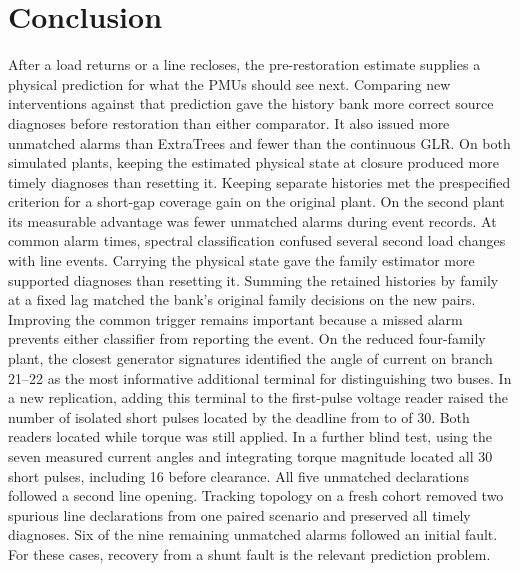 \section{Conclusion}
\label{sec:conclusion}

After a load returns or a line recloses, the pre-restoration estimate
supplies a physical prediction for what the PMUs should see next.
Comparing new interventions against that prediction gave the history
bank more correct source diagnoses before restoration than either
comparator. It also issued more unmatched alarms than ExtraTrees and
fewer than the continuous GLR. On both simulated plants, keeping the
estimated physical state at closure produced more timely diagnoses
than resetting it. Keeping separate histories met the prespecified criterion for a
short-gap coverage gain on the original plant. On the second plant its
measurable advantage was fewer unmatched alarms during event records.
At common alarm times, spectral classification confused several second
load changes with line events. Carrying the physical state gave the
family estimator more supported diagnoses than resetting it. Summing
the retained histories by family at a fixed lag matched the bank's
original family decisions on the new pairs. Improving the common
trigger remains important because a missed alarm prevents either
classifier from reporting the event. On the reduced four-family plant,
the closest generator signatures identified the angle of current on
branch 21--22 as the most informative additional terminal for
distinguishing two buses. In a new
replication, adding this terminal to the first-pulse voltage reader
raised the number of isolated short pulses located by the deadline
from \TorqueVoltShort{} to \TorqueTermShort{} of 30. Both readers
located \TorqueTermShortActive{} while torque was still applied.
In a further blind test, using the seven measured current angles
and integrating torque magnitude located all 30 short pulses,
including 16 before clearance. All five unmatched declarations
followed a second line opening. Tracking topology on a fresh cohort
removed two spurious line declarations from one paired scenario and preserved
all timely diagnoses. Six of the nine remaining unmatched alarms
followed an initial fault. For these cases, recovery from a shunt
fault is the relevant prediction problem.

